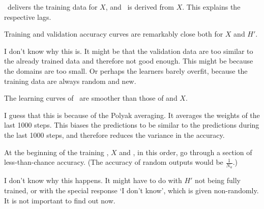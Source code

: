 \documentclass{farlamp}
\begin{document}
\AmpHp\ delivers the training data for $X$, and \Xpa\ is derived from $X$. This
explains the respective lags.

\begin{LCRow}
\end{LCRow}

\Obs Training and validation accuracy curves are remarkably close both
for $X$ and $H'$.

\Disc I don't know why this is. \OQ It might be that the validation data
are too similar to the already trained data and therefore not good enough. This
might be because the domains are too small. Or perhaps the learners barely
overfit, because the training data are always random and new.

\begin{LCRow}
\end{LCRow}

\Obs The learning curves of \Xpa\ are smoother than those of \AmpHp and $X$.

\Disc I guess that this is because of the Polyak averaging. It averages
the weights of the last 1000 steps. This biases the predictions to be similar to
the predictions during the last 1000 steps, and therefore reduces the variance
in the accuracy.

\begin{LCRow}
\end{LCRow}

\Obs At the beginning of the training \AmpHp, $X$ and \Xpa, in
this order, go through a section of less-than-chance accuracy. (The accuracy of
random outputs would be $\frac{1}{N_a}$.)

\Disc I don't know why this happens. \OQ It might have to do with $H'$ not being
fully trained, or with the special response ‘I don't know’, which is given
non-randomly. It is not important to find out now.
\end{document}
